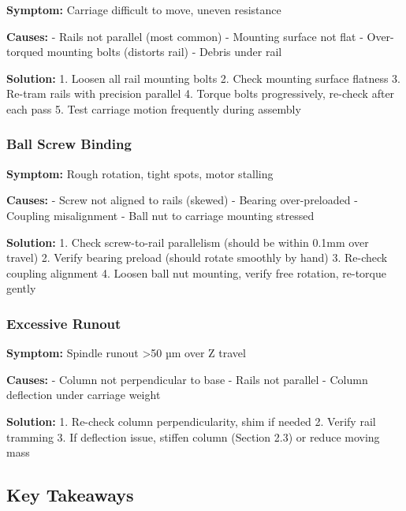 \documentclass[
]{article}
\begin{document}
\textbf{Symptom:} Carriage difficult to move, uneven resistance

\textbf{Causes:} - Rails not parallel (most common) - Mounting surface
not flat - Over-torqued mounting bolts (distorts rail) - Debris under
rail

\textbf{Solution:} 1. Loosen all rail mounting bolts 2. Check mounting
surface flatness 3. Re-tram rails with precision parallel 4. Torque
bolts progressively, re-check after each pass 5. Test carriage motion
frequently during assembly

\subsubsection{Ball Screw Binding}\label{ball-screw-binding}

\textbf{Symptom:} Rough rotation, tight spots, motor stalling

\textbf{Causes:} - Screw not aligned to rails (skewed) - Bearing
over-preloaded - Coupling misalignment - Ball nut to carriage mounting
stressed

\textbf{Solution:} 1. Check screw-to-rail parallelism (should be within
0.1mm over travel) 2. Verify bearing preload (should rotate smoothly by
hand) 3. Re-check coupling alignment 4. Loosen ball nut mounting, verify
free rotation, re-torque gently

\subsubsection{Excessive Runout}\label{excessive-runout}

\textbf{Symptom:} Spindle runout \textgreater50 µm over Z travel

\textbf{Causes:} - Column not perpendicular to base - Rails not parallel
- Column deflection under carriage weight

\textbf{Solution:} 1. Re-check column perpendicularity, shim if needed
2. Verify rail tramming 3. If deflection issue, stiffen column (Section
2.3) or reduce moving mass

\subsection{Key Takeaways}\label{key-takeaways}
\end{document}
